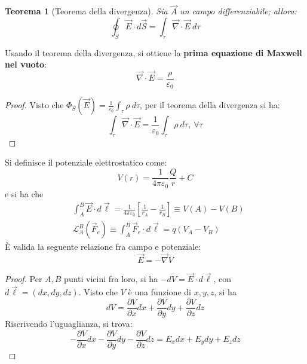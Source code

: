 \documentclass[a4paper]{scrartcl}
\numberwithin{equation}{subsection}
\theoremstyle{style1}
\newtheorem{teorema}{Teorema}[section]
\newenvironment{boxenv}[1][]{
    \begin{eqbox}[#1]
    }{
   \end{eqbox}
}
\begin{document}
\begin{teorema}
	[Teorema della divergenza]
	Sia $\vec{A}$ un campo differenziabile; allora:
	\begin{equation}
		\oint_{S} \vec{E}\cdot d\vec{S}= \int_{\tau } \vec{\nabla }\cdot \vec{E}\ d\tau 
	\end{equation}
\end{teorema}
\noindent Usando il teorema della divergenza, si ottiene la \textbf{prima equazione di Maxwell nel vuoto}:
\begin{equation}
	\vec{\nabla }\cdot \vec{E} = \frac{\rho }{\varepsilon _0}
\end{equation}
\begin{boxenv}[]
\begin{proof}
	Visto che $\Phi_S(\vec{E}) = \frac{1}{\varepsilon _0}\int_{\tau } \rho \ d\tau $, per il teorema della divergenza si ha:
	\[
	\int_{\tau } \vec{\nabla }\cdot \vec{E} = \frac{1}{\varepsilon _0} \int_{\tau } \rho  \ d\tau , \ \forall  \tau 
	\] 
\end{proof}
\end{boxenv}
\noindent Si definisce il potenziale elettrostatico come:
\begin{equation}
	V(r) = \frac{1}{4\pi \varepsilon _0} \frac{Q}{r} +C
\end{equation}
e si ha che
\begin{equation}
	\begin{split}
		&\int_{A} ^B \vec{E}\cdot d\vec{\ell } = \frac{1}{4 \pi \varepsilon _0} \left[ \frac{1}{r_A}-\frac{1}{r_B} \right] \equiv V(A) - V(B)\\
		& \mathcal{L}_A^B (\vec{F}_e) \equiv \int_{A} ^B \vec{F}_e\cdot d\vec{\ell } = q (V_A-V_B)
	\end{split}
\end{equation}
\`E valida la seguente relazione fra campo e potenziale:
\begin{equation}
	\vec{E} = - \vec{\nabla }V
\end{equation}
\begin{boxenv}[]
\begin{proof}
	Per $A,B$ punti vicini fra loro, si ha $-dV = \vec{E}\cdot d\vec{\ell }$, con $d\vec{\ell }= (dx,dy,dz)$. Visto che $V$ \`e una funzione di $x,y,z$, si ha 
	\[
	dV = \frac{\partial V}{\partial x} dx + \frac{\partial V}{\partial y} dy + \frac{\partial V}{\partial z} dz
	\] 
	Riscrivendo l'uguaglianza, si trova:
	\[
	-\frac{\partial V}{\partial x} dx - \frac{\partial V}{\partial y} dy - \frac{\partial V}{\partial z} dz = E_x dx + E_y dy + E_z dz 
	\] 
\end{proof}
\end{boxenv}
\end{document}
